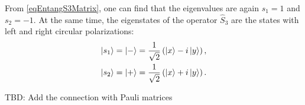 
From \eqref{eqEntangS3Matrix}, one can find that the eigenvalues
are again $s_1 = 1$ and $s_2 = -1$. At the same time, the eigenstates of the operator
$\hat{S}_3$ are the states with left and right circular polarizations:
\begin{eqnarray}
  \ket{ s_1 } = \ket{ - } = \frac{1}{\sqrt{2}}
  \left(
  \ket{x} - i \ket{y}
  \right),
  \nonumber \\
  \ket{ s_2 } = \ket{ + } = \frac{1}{\sqrt{2}}
  \left(
  \ket{x} + i \ket{y}
  \right).
  \label{eqEntangS3Eigenvec}
\end{eqnarray}

TBD: Add the connection with Pauli matrices



